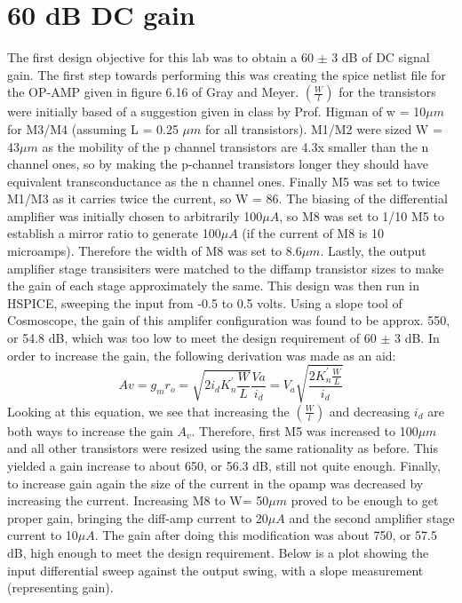 \documentclass[12pt]{article}
\begin{document}
\section{60 dB DC gain}
The first design objective for this lab was to obtain a 60 $\pm$ 3 dB of DC signal gain. The first step towards performing this was creating the spice netlist file for the OP-AMP given in figure 6.16 of Gray and Meyer. $(\frac{W}{l})$ for the transistors were initially based of a suggestion given in class by Prof. Higman of w = 10$\mu m$ for M3/M4 (assuming L = 0.25 $\mu m$ for all transistors). M1/M2 were sized W = 43$\mu m$ as the mobility of the p channel transistors are 4.3x smaller than the n channel ones, so by making the p-channel transistors longer they should have equivalent transconductance as the n channel ones. Finally M5 was set to twice M1/M3 as it carries twice the current, so W = 86. The biasing of the differential amplifier was initially chosen to arbitrarily 100$\mu A$, so M8 was set to 1/10 M5 to establish a mirror ratio to generate 100$\mu A$ (if the current of M8 is 10 microamps). Therefore the width of M8 was set to 8.6$\mu m$. Lastly, the output amplifier stage transisiters were matched to the diffamp transistor sizes to make the gain of each stage approximately the same. This design was then run in HSPICE, sweeping the input from -0.5 to 0.5 volts. Using a slope tool of Cosmoscope, the gain of this amplifer configuration was found to be approx. 550, or 54.8 dB, which was too low to meet the design requirement of 60 $\pm$ 3 dB. In order to increase the gain, the following derivation was made as an aid:
\begin{equation}
Av = g_m r_o = \sqrt{2i_dK_n^{'}\frac{W}{L}}\frac{Va}{i_d}= V_a\sqrt{\frac{2K_n^{'}\frac{W}{L}}{i_d}}
\end{equation}
Looking at this equation, we see that increasing the $(\frac{W}{l})$ and decreasing $i_d$ are both ways to increase the gain $A_v$. Therefore, first M5 was increased to 100$\mu m$ and all other transistors were resized using the same rationality as before. This yielded a gain increase to about 650, or 56.3 dB, still not quite enough. Finally, to increase gain again the size of the current in the opamp was decreased by increasing the current. Increasing M8 to W= 50$\mu m$ proved to be enough to get proper gain, bringing the diff-amp current to 20$\mu A$ and the second amplifier stage current to 10$\mu A$. The gain after doing this modification was about 750, or 57.5 dB, high enough to meet the design requirement. Below is a plot showing the input differential sweep against the output swing, with a slope measurement (representing gain).
\end{document}
